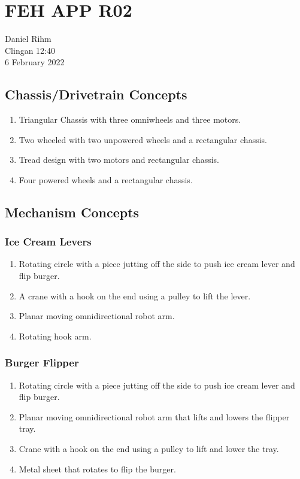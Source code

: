 \documentclass[12pt]{extarticle}
\begin{document}
\section*{FEH APP R02}

Daniel Rihm\\
Clingan 12:40\\
6 February 2022

\subsection*{Chassis/Drivetrain Concepts}
\begin{enumerate}
    \item Triangular Chassis with three omniwheels and three motors.
    \item Two wheeled with two unpowered wheels and a rectangular chassis.
    \item Tread design with two motors and rectangular chassis.
    \item Four powered wheels and a rectangular chassis.
\end{enumerate}

\subsection*{Mechanism Concepts}
\subsubsection*{Ice Cream Levers}
\begin{enumerate}
    \item Rotating circle with a piece jutting off the side to push ice cream lever and flip burger.
    \item A crane with a hook on the end using a pulley to lift the lever.
    \item Planar moving omnidirectional robot arm.
    \item Rotating hook arm.
\end{enumerate}

\subsubsection*{Burger Flipper}
\begin{enumerate}
    \item Rotating circle with a piece jutting off the side to push ice cream lever and flip burger.
    \item Planar moving omnidirectional robot arm that lifts and lowers the flipper tray.
    \item Crane with a hook on the end using a pulley to lift and lower the tray.
    \item Metal sheet that rotates to flip the burger.
\end{enumerate}
\end{document}
